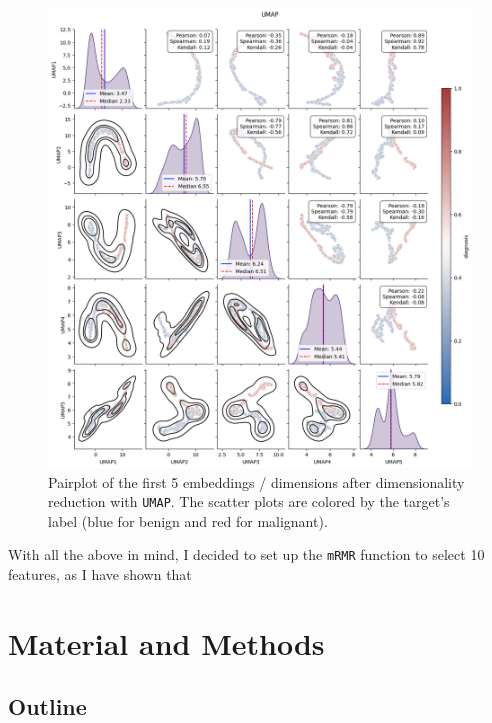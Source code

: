 \documentclass[12pt]{article}
\begin{document}
\begin{figure}[H]
    \centering
    \includegraphics[width=\textwidth]{ims/umap.png}
    \caption{Pairplot of the first 5 embeddings / dimensions after dimensionality
    reduction with \texttt{UMAP}. The scatter plots are colored by the target's
    label (blue for benign and red for malignant).}
    \label{fig:umap}
\end{figure}

With all the above in mind, I decided to set up the \texttt{mRMR} function to
select 10 features, as I have shown that 

\section{Material and Methods}

\subsection{Outline}
\end{document}
